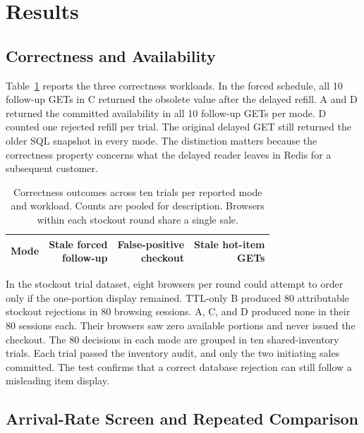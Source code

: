 \section{Results}

\subsection{Correctness and Availability}

Table~\ref{tab:correctness} reports the three correctness workloads. In the forced schedule, all 10 follow-up GETs in C returned the obsolete value after the delayed refill. A and D returned the committed availability in all 10 follow-up GETs per mode. D counted one rejected refill per trial. The original delayed GET still returned the older SQL snapshot in every mode. The distinction matters because the correctness property concerns what the delayed reader leaves in Redis for a subsequent customer.

\begin{table}[t]
\centering
\caption{Correctness outcomes across ten trials per reported mode and workload. Counts are pooled for description. Browsers within each stockout round share a single sale.}
\label{tab:correctness}
\setlength{\tabcolsep}{4pt}
\begin{tabular}{@{}c r r r@{}}
\toprule
Mode & \shortstack{Stale forced\\follow-up} & \shortstack{False-positive\\checkout} & \shortstack{Stale hot-item\\GETs} \\
\midrule

\end{tabular}
\end{table}

In the stockout trial dataset, eight browsers per round could attempt to order only if the one-portion display remained. TTL-only B produced 80 attributable stockout rejections in 80 browsing sessions. A, C, and D produced none in their 80 sessions each. Their browsers saw zero available portions and never issued the checkout. The 80 decisions in each mode are grouped in ten shared-inventory trials. Each trial passed the inventory audit, and only the two initiating sales committed. The test confirms that a correct database rejection can still follow a misleading item display.



\subsection{Arrival-Rate Screen and Repeated Comparison}


